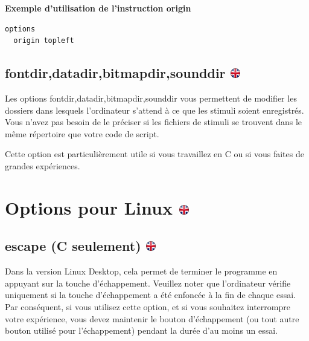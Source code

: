 \documentclass[
]{book}
\begin{document}
\textbf{Exemple d'utilisation de l'instruction origin}

\begin{verbatim}
options
  origin topleft
\end{verbatim}

\hypertarget{fontdirdatadirbitmapdirsounddir}{%
\subsection[fontdir,datadir,bitmapdir,sounddir
]{\texorpdfstring{fontdir,datadir,bitmapdir,sounddir
\href{https://www.psytoolkit.org/doc3.2.0/syntax.html\#options-sounddir}{\protect\includegraphics{img/ukflag.png}}}{fontdir,datadir,bitmapdir,sounddir }}\label{fontdirdatadirbitmapdirsounddir}}

Les options fontdir,datadir,bitmapdir,sounddir vous permettent de
modifier les dossiers dans lesquels l'ordinateur s'attend à ce que les
stimuli soient enregistrés. Vous n'avez pas besoin de le préciser si les
fichiers de stimuli se trouvent dans le même répertoire que votre code
de script.

Cette option est particulièrement utile si vous travaillez en C ou si
vous faites de grandes expériences.

\hypertarget{options-pour-linux}{%
\section[Options pour Linux ]{\texorpdfstring{Options pour Linux
\href{https://www.psytoolkit.org/doc3.2.0/syntax.html\#options-sounddir}{\protect\includegraphics{img/ukflag.png}}}{Options pour Linux }}\label{options-pour-linux}}

\hypertarget{escape-c-seulement}{%
\subsection[escape (C seulement) ]{\texorpdfstring{escape (C seulement)
\href{https://www.psytoolkit.org/doc3.2.0/syntax.html\#options-escape}{\protect\includegraphics{img/ukflag.png}}}{escape (C seulement) }}\label{escape-c-seulement}}

Dans la version Linux Desktop, cela permet de terminer le programme en
appuyant sur la touche d'échappement. Veuillez noter que l'ordinateur
vérifie uniquement si la touche d'échappement a été enfoncée à la fin de
chaque essai. Par conséquent, si vous utilisez cette option, et si vous
souhaitez interrompre votre expérience, vous devez maintenir le bouton
d'échappement (ou tout autre bouton utilisé pour l'échappement) pendant
la durée d'au moins un essai.
\end{document}
